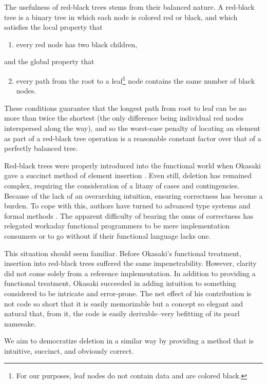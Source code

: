 \documentclass[preprint]{sigplanconf}
\begin{document}
The usefulness of red-black trees stems from their balanced nature. A red-black tree is a binary tree in which each node is colored red or black, and which satisfies the local property that
\begin{enumerate}
\item every red node has two black children,
\end{enumerate}
and the global property that
\begin{enumerate}
\setcounter{enumi}{1}
\item every path from the root to a leaf\footnote{For our purposes, leaf nodes do not contain data and are colored black.} node contains the same number of black nodes.
\end{enumerate}
These conditions guarantee that the longest path from root to leaf can be no more than twice the shortest (the only difference being individual red nodes interspersed along the way), and so the worst-case penalty of locating an element as part of a red-black tree operation is a reasonable constant factor over that of a perfectly balanced tree.

Red-black trees were properly introduced into the functional world when Okasaki gave a succinct method of element insertion \cite{okasaki1999functional}. Even still, deletion has remained complex, requiring the consideration of a litany of cases and contingencies. Because of the lack of an overarching intuition, ensuring correctness has become a burden. To cope with this, authors have turned to advanced type systems \cite{kahrs2001red} and formal methods \cite{appel2011efficient}. The apparent difficulty of bearing the onus of correctness has relegated workaday functional programmers to be mere implementation consumers or to go without if their functional language lacks one.

This situation should seem familiar. Before Okasaki's functional treatment, insertion into red-black trees suffered the same impenetrability. However, clarity did not come solely from a reference implementation. In addition to providing a functional treatment, Okasaki succeeded in adding intuition to something considered to be intricate and error-prone. The net effect of his contribution is not code so short that it is easily memorizable but a concept so elegant and natural that, from it, the code is easily derivable--very befitting of its pearl namesake.

We aim to democratize deletion in a similar way by providing a method that is intuitive, succinct, and obviously correct.
\end{document}
